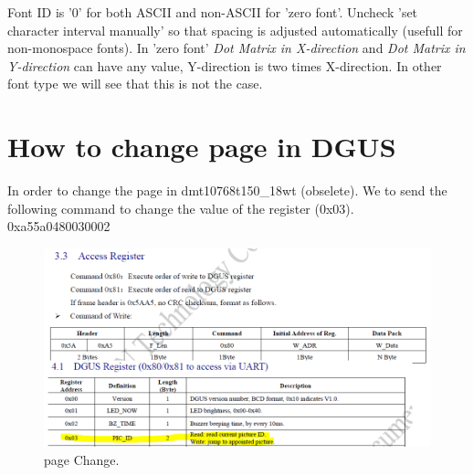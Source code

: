 \documentclass[12pt, A4]{article} %
\begin{document}
Font ID is '0' for both ASCII and non-ASCII for 'zero font'. Uncheck 'set character interval manually' so that spacing is adjusted automatically (usefull for non-monospace fonts). In 'zero font' \emph{Dot Matrix in X-direction} and \emph{Dot Matrix in Y-direction} can have any value, Y-direction is two times X-direction. In other font type we will see that this is not the case.
\newpage

\section{How to change page in DGUS}
In order to change the page in dmt10768t150\_18wt (obselete). We to send the following command to change the value of the register (0x03).\\

{\huge 0xa55a0480030002\\}

\begin{figure}[!htb] %
	\centering
	\includegraphics[width=12cm]{pageChange} 
	\caption{page Change.\\}
\end{figure}
\end{document}
